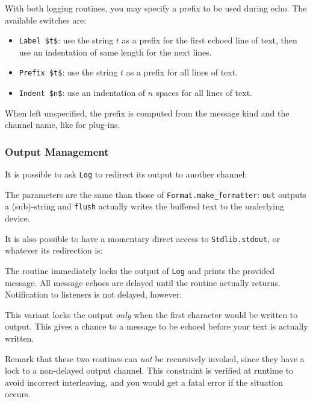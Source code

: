 With both logging routines, you may specify a prefix to be used during
echo. The available switches are:
\begin{itemize}
\item[] \lstinline|Label $t$|: use the string $t$ as a prefix for the
  first echoed line of text, then use an indentation of same length
  for the next lines.
\item[] \lstinline|Prefix $t$|: use the string $t$ as a prefix for all
  lines of text.
\item[] \lstinline|Indent $n$|: use an indentation of $n$ spaces for
  all lines of text.
\end{itemize}

When left unspecified, the prefix is computed from the message kind
and the channel name, like for plug-ins.

\subsubsection{Output Management}

It is possible to ask \lstinline{Log} to redirect its output to
another channel:
\begin{description}
  The parameters are the same than those of
  \lstinline{Format.make_formatter}: \lstinline{out} outputs a
  (sub)-string and \lstinline{flush} actually writes the buffered
  text to the underlying device.
\end{description}

It is also possible to have a momentary direct access to
\lstinline{Stdlib.stdout}, or whatever its redirection is:
\begin{description}
  The routine immediately locks the output of \lstinline{Log} and 
  prints the provided message. All message echoes are delayed until
  the routine actually returns. Notification to listeners is not
  delayed, however.

  This variant locks the output \emph{only} when the first character
  would be written to output. This gives a chance to a message to be echoed before
  your text is actually written.
\end{description}

Remark that these two routines can \emph{not} be recursively invoked,
since they have a lock to a non-delayed output channel. This
constraint is verified at runtime to avoid incorrect interleaving, and
you would get a fatal error if the situation occurs.

